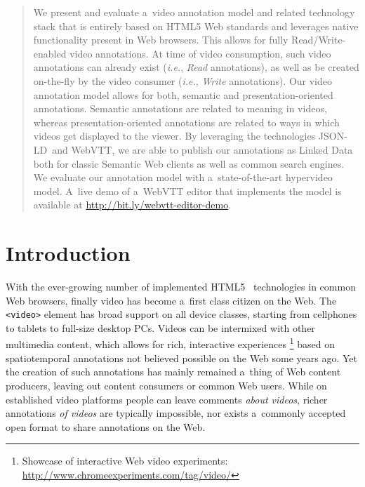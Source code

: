 \documentclass{sig-alternate}
\newcommand{\inlinelistingsize}{\fontsize{8pt}{11pt}}
\let\oldurl\url
\renewcommand{\url}[1]{\inlinelistingsize\oldurl{#1}}
\def\JSONLD{\mbox{JSON-LD}}
\begin{document}
\maketitle
\begin{abstract}
We present and evaluate a~video annotation model
and related technology stack that is entirely based
on HTML5 Web standards and leverages native functionality
present in Web browsers.
This allows for fully Read/Write-enabled video annotations.
At time of video consumption, such video annotations
can already exist (\emph{i.e.}, \emph{Read} annotations),
as well as be created on-the-fly by the video consumer
(\emph{i.e.}, \emph{Write} annotations).
Our video annotation model allows for both,
semantic and presentation-oriented annotations.
Semantic annotations are related to meaning in videos,
whereas pre\-sen\-tation-oriented annotations are related to
ways in which videos get displayed to the viewer.
By leveraging the technologies \JSONLD~and WebVTT,
we are able to publish our annotations as Linked Data
both for classic Semantic Web clients
as well as common search engines.
We evaluate our annotation model
with a~state-of-the-art hypervideo model.
A~live demo of a~WebVTT editor that implements the model
is available at \url{http://bit.ly/webvtt-editor-demo}.
\end{abstract}



\keywords{Video annotation, WebVTT, \JSONLD, media fragments}

\section{Introduction}

With the ever-growing number of implemented HTML5~\cite{berjon2013html5}
technologies in common Web browsers,
finally video has become a~first class citizen on the Web.
The \texttt{<video>} element has broad support
on all device classes,
starting from cellphones to tablets to full-size desktop PCs.
Videos can be intermixed with other multimedia content,
which allows for rich, interactive experiences%
\footnote{Showcase of interactive Web video experiments:
\url{http://www.chromeexperiments.com/tag/video/}}
based on spatiotemporal annotations
not believed possible on the Web some years ago.
Yet the creation of such annotations
has mainly remained a~thing of Web content producers,
leaving out content consumers or common Web users.
While on established video platforms people
can leave comments \emph{about videos},
richer annotations \emph{of videos} are typically impossible,
nor exists a~commonly accepted open format
to share annotations on the Web.
\end{document}

